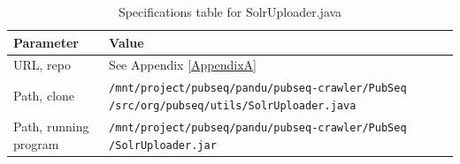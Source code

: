 \begin{table}[htbp]
\caption{Specifications table for SolrUploader.java}
\centering
\begin{tabularx}{\textwidth}{ | l | X | }
  \hline
  Parameter & Value \\
  \hline
  URL, repo & See Appendix \ref{AppendixA} \\
  Path, clone & \texttt{/mnt/project/pubseq/pandu/pubseq-crawler/PubSeq /src/org/pubseq/utils/SolrUploader.java} \\
  Path, running program & \texttt{/mnt/project/pubseq/pandu/pubseq-crawler/PubSeq /SolrUploader.jar}\\
  \hline
\end{tabularx}
\end{table}